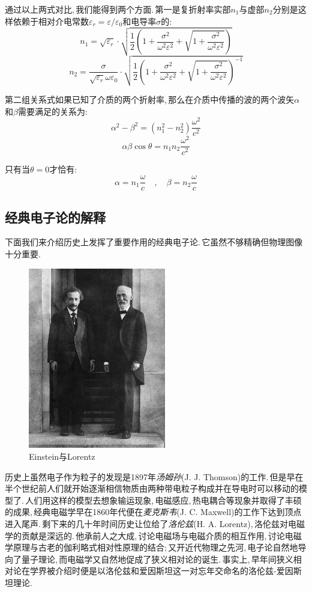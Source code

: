 通过以上两式对比,\,我们能得到两个方面.\,第一是复折射率实部$n_1$与虚部$n_2$分别是这样依赖于相对介电常数$\varepsilon_r=\varepsilon/\varepsilon_0$和电导率$\sigma$的:
\[n_1=\sqrt{\varepsilon_r}\cdot \sqrt{\frac{1}{2}\left(1+\frac{\sigma^2}{\omega^2\varepsilon^2}+\sqrt{1+\frac{\sigma^2}{\omega^2\varepsilon^2}}\right)}\]
\[n_2=\frac{\sigma}{\sqrt{\varepsilon_r}\omega\varepsilon_0}\cdot\sqrt{\frac{1}{2}\left(1+\frac{\sigma^2}{\omega^2\varepsilon^2}+\sqrt{1+\frac{\sigma^2}{\omega^2\varepsilon^2}}\right)^{-1}}\]

第二组关系式如果已知了介质的两个折射率,\,那么在介质中传播的波的两个波矢$\alpha$和$\beta$需要满足的关系为:
\[\alpha^2-\beta^2=(n_1^2-n_2^2)\frac{\omega^2}{c^2}\]
\[\alpha\beta\cos\theta=n_1n_2\frac{\omega^2}{c^2}\]

只有当$\theta=0$才恰有:
\[\alpha=n_1\frac{\omega}{c}\quad,\quad\beta=n_2\frac{\omega}{c}\]


\subsection{经典电子论的解释}

下面我们来介绍历史上发挥了重要作用的经典电子论.\,它虽然不够精确但物理图像十分重要.

\begin{figure}
\centering
\vspace{-3pt}
\includegraphics[width=6cm]{image/18-1-2.jpg}
\caption{\rm Einstein与Lorentz}
\end{figure}

历史上虽然电子作为粒子的发现是1897年\emph{汤姆孙}({\rm J. J. Thomson})的工作.\,但是早在半个世纪前人们就开始逐渐相信物质由两种带电粒子构成并在导电时可以移动的模型了.\,人们用这样的模型去想象输运现象,\,电磁感应,\,热电耦合等现象并取得了丰硕的成果,\,经典电磁学早在1860年代便在\emph{麦克斯韦}({\rm J. C. Maxwell})的工作下达到顶点进入尾声.\,剩下来的几十年时间历史让位给了\emph{洛伦兹}({\rm H. A. Lorentz}),\,洛伦兹对电磁学的贡献是深远的.\,他承前人之大成,\,讨论电磁场与电磁介质的相互作用,\,讨论电磁学原理与古老的伽利略式相对性原理的结合;\,又开近代物理之先河,\,电子论自然地导向了量子理论,\,而电磁学又自然地促成了狭义相对论的诞生.\,事实上,\,早年间狭义相对论在学界被介绍时便是以洛伦兹和爱因斯坦这一对忘年交命名的洛伦兹-爱因斯坦理论.


